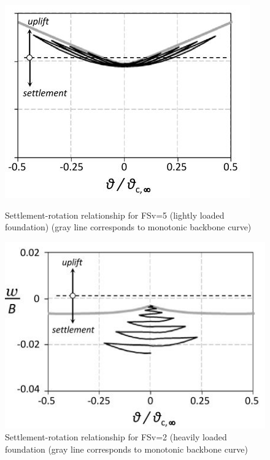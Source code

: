 \documentclass[12pt,a4paper]{report}
\begin{document}
\begin{figure}[!h]
	\centering
	\begin{minipage}[b]{0.4\textwidth}
		\includegraphics[width=\textwidth]{settle}
		\caption{Settlement-rotation relationship for FSv=5 (lightly loaded foundation) (gray line corresponds to monotonic backbone curve)}
		\label{set}
	\end{minipage}
	\hfill
	\begin{minipage}[b]{0.45\textwidth}
		\includegraphics[width=\textwidth]{settle2}
		\caption{Settlement-rotation relationship for FSv=2 (heavily loaded foundation (gray line corresponds to monotonic backbone curve)}
		\label{set2}
	\end{minipage}
\end{figure} 
\end{document}
